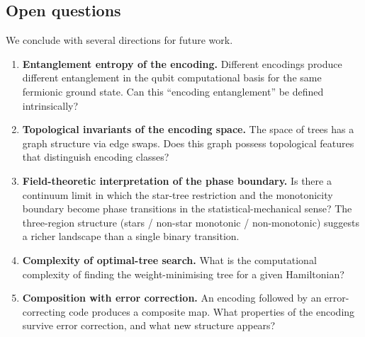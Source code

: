 \subsection{Open questions}
\label{sec:disc-open}

We conclude with several directions for future work.

\begin{enumerate}
  \item \textbf{Entanglement entropy of the encoding.}
    Different encodings produce different entanglement in the qubit
    computational basis for the same fermionic ground state.  Can this
    ``encoding entanglement'' be defined intrinsically?

  \item \textbf{Topological invariants of the encoding space.}
    The space of trees has a graph structure via edge swaps.  Does
    this graph possess topological features that distinguish encoding
    classes?

  \item \textbf{Field-theoretic interpretation of the phase boundary.}
    Is there a continuum limit in which the star-tree restriction and
    the monotonicity boundary become phase transitions in the
    statistical-mechanical sense?  The three-region structure
    (stars / non-star monotonic / non-monotonic) suggests a richer
    landscape than a single binary transition.

  \item \textbf{Complexity of optimal-tree search.}
    What is the computational complexity of finding the weight-minimising
    tree for a given Hamiltonian?

  \item \textbf{Composition with error correction.}
    An encoding followed by an error-correcting code produces a
    composite map.  What properties of the encoding survive error
    correction, and what new structure appears?
\end{enumerate}
